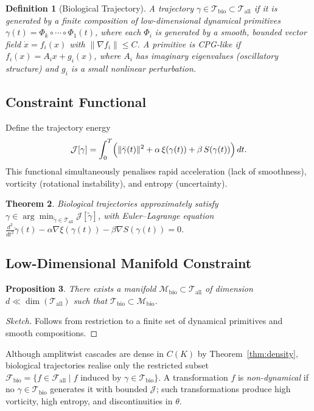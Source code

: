 \documentclass[12pt, a4paper]{article}
\newtheorem{theorem}{Theorem}[section]
\newtheorem{definition}[theorem]{Definition}
\newtheorem{proposition}[theorem]{Proposition}
\theoremstyle{remark}
\theoremstyle{definition}
\begin{document}
\begin{definition}[Biological Trajectory]
A trajectory $\gamma \in \mathcal{T}_{\mathrm{bio}} \subset \mathcal{T}_{\mathrm{all}}$
if it is generated by a finite composition of low-dimensional dynamical primitives
$\gamma(t) = \Phi_k \circ \cdots \circ \Phi_1(t)$, where each $\Phi_i$ is generated by
a smooth, bounded vector field $\dot{x} = f_i(x)$ with $\|\nabla f_i\| \le C$.
A primitive is \emph{CPG-like} if $f_i(x) = A_i x + g_i(x)$, where $A_i$ has imaginary
eigenvalues (oscillatory structure) and $g_i$ is a small nonlinear perturbation.
\end{definition}

\subsection{Constraint Functional}

Define the trajectory energy
\[
\mathcal{J}[\gamma]
= \int_0^T \Bigl(
\|\ddot{\gamma}(t)\|^2
+ \alpha\,\xi(\gamma(t))
+ \beta\,S(\gamma(t))
\Bigr)\,dt.
\]
This functional simultaneously penalises rapid acceleration (lack of smoothness), vorticity
(rotational instability), and entropy (uncertainty).

\begin{theorem}
Biological trajectories approximately satisfy
$\gamma \in \arg\min_{\tilde\gamma \in \mathcal{T}_{\mathrm{all}}} \mathcal{J}[\tilde\gamma]$,
with Euler--Lagrange equation
$\frac{d^2}{dt^2}\ddot\gamma(t) - \alpha\nabla\xi(\gamma(t)) - \beta\nabla S(\gamma(t)) = 0$.
\end{theorem}

\subsection{Low-Dimensional Manifold Constraint}

\begin{proposition}
There exists a manifold $\mathcal{M}_{\mathrm{bio}} \subset \mathcal{T}_{\mathrm{all}}$ of
dimension $d \ll \dim(\mathcal{T}_{\mathrm{all}})$ such that $\mathcal{T}_{\mathrm{bio}}
\subset \mathcal{M}_{\mathrm{bio}}$.
\end{proposition}

\begin{proof}[Sketch]
Follows from restriction to a finite set of dynamical primitives and smooth compositions.
\end{proof}

Although amplitwist cascades are dense in $C(K)$ by Theorem~\ref{thm:density}, biological
trajectories realise only the restricted subset $\mathcal{F}_{\mathrm{bio}} = \{f \in
\mathcal{F}_{\mathrm{all}} \mid f \text{ induced by } \gamma \in \mathcal{T}_{\mathrm{bio}}\}$.
A transformation $f$ is \emph{non-dynamical} if no $\gamma \in \mathcal{T}_{\mathrm{bio}}$
generates it with bounded $\mathcal{J}$; such transformations produce high vorticity, high
entropy, and discontinuities in $\theta$.
\end{document}
